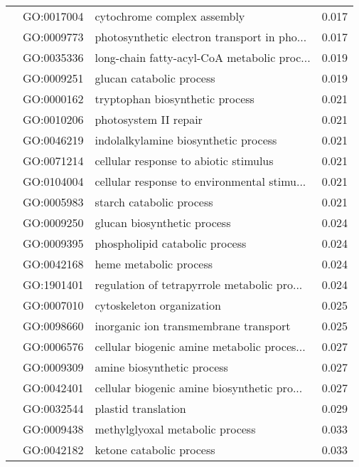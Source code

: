 \begin{longtable}{lllr}
   & GO:0017004 &                  cytochrome complex assembly &         0.017 \\
   & GO:0009773 &  photosynthetic electron transport in pho... &         0.017 \\
   & GO:0035336 &  long-chain fatty-acyl-CoA metabolic proc... &         0.019 \\
   & GO:0009251 &                     glucan catabolic process &         0.019 \\
   & GO:0000162 &              tryptophan biosynthetic process &         0.021 \\
   & GO:0010206 &                        photosystem II repair &         0.021 \\
   & GO:0046219 &         indolalkylamine biosynthetic process &         0.021 \\
   & GO:0071214 &        cellular response to abiotic stimulus &         0.021 \\
   & GO:0104004 &  cellular response to environmental stimu... &         0.021 \\
   & GO:0005983 &                     starch catabolic process &         0.021 \\
   & GO:0009250 &                  glucan biosynthetic process &         0.024 \\
   & GO:0009395 &               phospholipid catabolic process &         0.024 \\
   & GO:0042168 &                       heme metabolic process &         0.024 \\
   & GO:1901401 &  regulation of tetrapyrrole metabolic pro... &         0.024 \\
   & GO:0007010 &                    cytoskeleton organization &         0.025 \\
   & GO:0098660 &        inorganic ion transmembrane transport &         0.025 \\
   & GO:0006576 &  cellular biogenic amine metabolic proces... &         0.027 \\
   & GO:0009309 &                   amine biosynthetic process &         0.027 \\
   & GO:0042401 &  cellular biogenic amine biosynthetic pro... &         0.027 \\
   & GO:0032544 &                          plastid translation &         0.029 \\
   & GO:0009438 &              methylglyoxal metabolic process &         0.033 \\
   & GO:0042182 &                     ketone catabolic process &         0.033 \\

\end{longtable}
